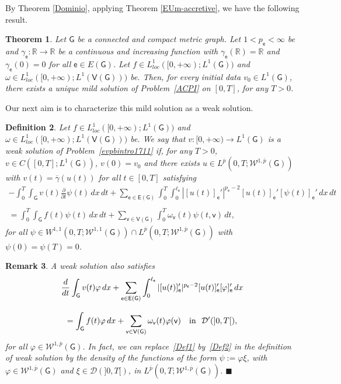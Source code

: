 \documentclass[reqno,12pt]{amsart}
\newtheorem{theorem}{Theorem}[section]
\newtheorem{definition}[theorem]{Definition}
\newtheorem{remark}[theorem]{Remark}
\def\R{\mathbb R} %
\def\e{\mathsf{e}} 	%
\def\v{\mathsf{v}}	%
\newcommand{\G}{\mathsf{G}}	%
\newcommand{\V}{\mathsf{V}}	%
\newcommand{\E}{\mathsf{E}}	%
\numberwithin{equation}{section} %
\begin{document}
By Theorem \ref{Dominio}, applying Theorem \ref{EUm-accretive}, we have the following result. 

 \begin{theorem}\label{Existencemild}  Let  $\G$ be a   connected and compact metric graph.
  Let $1 < p_\e < \infty$ be and   $\gamma_\e:\R\to \R$ be a continuous and increasing function with $\gamma_\e(\mathbb{R})=\mathbb{R}$ and $\gamma_\e(0)=0$ for all $\e \in E(\G)$.  Let $f\in L^1_{loc}([0,+\infty);L^{1}(\G))$  and $\omega\in L^1_{loc}([0,+\infty);L^1(\V(\G)))$ be. Then, for every initial data $v_0 \in L^1(\G)$, 
there exists a unique mild solution of Problem~\eqref{ACPI}  on $[0,T]$,    for any $T>0$.
 \end{theorem}


 Our next aim is to characterize this mild solution as a weak solution.
 
\begin{definition}  Let $f\in L^1_{loc}([0,+\infty);L^{1}(\G))$  and $\omega\in L^1_{loc}([0,+\infty);L^1(\V(\G)))$ be. We say that $v:[0,+\infty)\to L^1(\G)$ is a weak solution  of Problem~\eqref{evpbintro1711} if, for any $T>0$, $v \in C([0,T]; L^1(\G))$,  $v(0) = v_0$ and  there exists  $u \in L^{\overline{p}}(0,T;  \mathcal{W}^{1,\overline{p}}(\G))$ with $v(t) = \overline{\gamma}(u(t))$ for all $t \in [0,T]$ satisfying
\begin{equation}\label{Def1} \begin{array}{c} - \displaystyle\int_0^T \int_\G v(t) \frac{\partial}{\partial t} \psi(t)\,dx\, dt +  \sum_{\e \in\E(\G)}\int_0^T  \int_{0}^{\ell_\e}|[u(t)]_\e'|^{p_\e-2}[u(t)]_\e' [\psi(t)]_\e'  \,dx\, dt \\ \\
 \displaystyle = \int_0^T \int_{\G} f(t) \psi(t)\,dx\, dt+\sum_{\v\in \V(\G)}\int_0^T\omega_\v(t)\psi(t,\v) \, dt, \end{array}
\end{equation}
for all $\psi \in W^{1,1}(0,T; \mathcal{W}^{1,{1}}(\G)) \cap L^{\overline{p}}(0,T; \mathcal{W}^{1,\overline{p}}(\G))$ with $\psi(0) = \psi (T) =0$.
\end{definition}
\begin{remark}\rm 
A weak solution also satisfies
\begin{equation}\label{Def2}\begin{array}{c}\displaystyle  \frac{d}{dt}  \int_\G v(t) \varphi\,dx  +    \sum_{\e \in\E(\G)}\int_{0}^{\ell_\e}|[u(t)]_\e'|^{p_\e-2}[u(t)]_\e' [\varphi]_\e'\,dx  \\ \\   \displaystyle = \int_{\G} f(t) \varphi\,dx+\sum_{\v\in \V(\G)}\omega_\v(t)\varphi(\v) \quad \hbox{in} \ \ \mathcal{D}^\prime(]0,T[),
\end{array}
\end{equation}
for all $\varphi \in  \mathcal{W}^{1,\overline{p}}(\G)$.
In fact, we can replace~\eqref{Def1} by~\eqref{Def2} in the definition of weak solution by the density of the functions of the form  $\psi := \varphi \xi$, with  $\varphi \in \mathcal{W}^{1,\overline{p}}(\G)$ and $\xi \in \mathcal{D}(]0, T[)$, in $ L^{\overline{p}}(0,T; \mathcal{W}^{1,\overline{p}}(\G))$.  \hfill $\blacksquare$
\end{remark}
\end{document}
